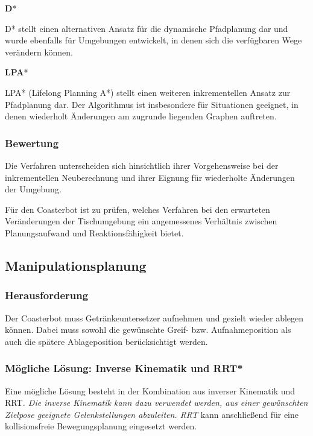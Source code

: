 \textbf{D}*

D* stellt einen alternativen Ansatz für die dynamische Pfadplanung dar
und wurde ebenfalls für Umgebungen entwickelt, in denen sich die
verfügbaren Wege verändern können.

\textbf{LPA}*

LPA* (Lifelong Planning A*) stellt einen weiteren inkrementellen Ansatz
zur Pfadplanung dar. Der Algorithmus ist insbesondere für Situationen
geeignet, in denen wiederholt Änderungen am zugrunde liegenden Graphen
auftreten.

\subsubsection{Bewertung}\label{bewertung-2}

Die Verfahren unterscheiden sich hinsichtlich ihrer Vorgehensweise bei
der inkrementellen Neuberechnung und ihrer Eignung für wiederholte
Änderungen der Umgebung.

Für den Coasterbot ist zu prüfen, welches Verfahren bei den erwarteten
Veränderungen der Tischumgebung ein angemessenes Verhältnis zwischen
Planungsaufwand und Reaktionsfähigkeit bietet.

\subsection{Manipulationsplanung}\label{manipulationsplanung}

\subsubsection{Herausforderung}\label{herausforderung-3}

Der Coasterbot muss Getränkeuntersetzer aufnehmen und gezielt wieder
ablegen können. Dabei muss sowohl die gewünschte Greif- bzw.
Aufnahmeposition als auch die spätere Ablageposition berücksichtigt
werden.

\subsubsection{Mögliche Lösung: Inverse Kinematik und
RRT*}\label{muxf6gliche-luxf6sung-inverse-kinematik-und-rrt}

Eine mögliche Lösung besteht in der Kombination aus inverser Kinematik
und RRT\emph{. Die inverse Kinematik kann dazu verwendet werden, aus
einer gewünschten Zielpose geeignete Gelenkstellungen abzuleiten. RRT}
kann anschließend für eine kollisionsfreie Bewegungsplanung eingesetzt
werden.

